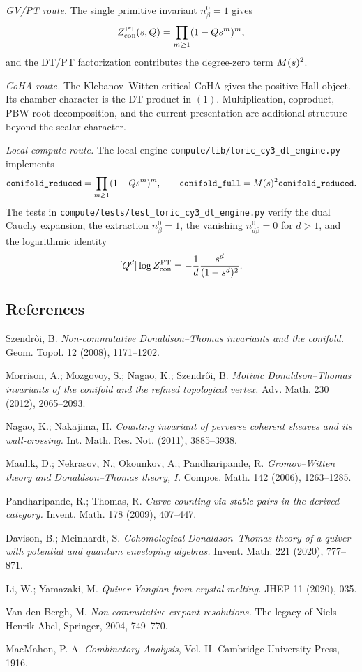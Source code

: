 \emph{GV/PT route.}  The single primitive invariant
\(n^0_{\beta}=1\) gives
\[
  Z^{\mathrm{PT}}_{\mathrm{con}}(s,Q)
  =
  \prod_{m\geq 1}(1-Qs^m)^m ,
\]
and the DT/PT factorization contributes the degree-zero term
\(M(s)^2\).

\emph{CoHA route.}  The Klebanov--Witten critical CoHA gives the
positive Hall object.  Its chamber character is the DT product in
\((1)\).  Multiplication, coproduct, PBW root decomposition, and the
current presentation are additional structure beyond the scalar
character.

\emph{Local compute route.}  The local engine
\texttt{compute/lib/toric\_cy3\_dt\_engine.py} implements
\[
  \texttt{conifold\_reduced}=\prod_{m\geq 1}(1-Qs^m)^m,\qquad
  \texttt{conifold\_full}=M(s)^2\texttt{conifold\_reduced}.
\]
The tests in \texttt{compute/tests/test\_toric\_cy3\_dt\_engine.py}
verify the dual Cauchy expansion, the extraction
\(n^0_{\beta}=1\), the vanishing \(n^0_{d\beta}=0\) for \(d>1\), and the
logarithmic identity
\[
  [Q^d]\log Z^{\mathrm{PT}}_{\mathrm{con}}
  =
  -\frac{1}{d}\frac{s^d}{(1-s^d)^2}.
\]

\subsection*{References}

Szendr\H{o}i, B. \emph{Non-commutative Donaldson--Thomas invariants and
the conifold.} Geom. Topol. 12 (2008), 1171--1202.

Morrison, A.; Mozgovoy, S.; Nagao, K.; Szendr\H{o}i, B.
\emph{Motivic Donaldson--Thomas invariants of the conifold and the
refined topological vertex.} Adv. Math. 230 (2012), 2065--2093.

Nagao, K.; Nakajima, H. \emph{Counting invariant of perverse coherent
sheaves and its wall-crossing.} Int. Math. Res. Not. (2011), 3885--3938.

Maulik, D.; Nekrasov, N.; Okounkov, A.; Pandharipande, R.
\emph{Gromov--Witten theory and Donaldson--Thomas theory, I.}
Compos. Math. 142 (2006), 1263--1285.

Pandharipande, R.; Thomas, R. \emph{Curve counting via stable pairs in
the derived category.} Invent. Math. 178 (2009), 407--447.

Davison, B.; Meinhardt, S. \emph{Cohomological Donaldson--Thomas theory
of a quiver with potential and quantum enveloping algebras.} Invent.
Math. 221 (2020), 777--871.

Li, W.; Yamazaki, M. \emph{Quiver Yangian from crystal melting.}
JHEP 11 (2020), 035.

Van den Bergh, M. \emph{Non-commutative crepant resolutions.}
The legacy of Niels Henrik Abel, Springer, 2004, 749--770.

MacMahon, P. A. \emph{Combinatory Analysis}, Vol. II. Cambridge
University Press, 1916.
